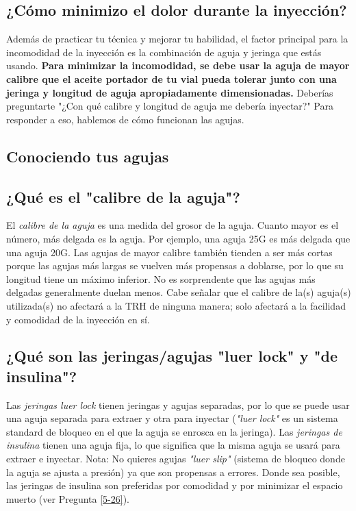 \documentclass{article}
\begin{document}
\subsection{¿Cómo minimizo el dolor durante la inyección?}

Además de practicar tu técnica y mejorar tu habilidad, el factor principal para la incomodidad de la inyección es la combinación de aguja y jeringa que estás usando. \textbf{Para minimizar la incomodidad, se debe usar la aguja de mayor calibre que el aceite portador de tu vial pueda tolerar junto con una jeringa y longitud de aguja apropiadamente dimensionadas.} Deberías preguntarte "¿Con qué calibre y longitud de aguja me debería inyectar?" Para responder a eso, hablemos de cómo funcionan las agujas.

\subsection*{Conociendo tus agujas}

\subsection{¿Qué es el "calibre de la aguja"?}

El \textit{calibre de la aguja} es una medida del grosor de la aguja. Cuanto mayor es el número, más delgada es la aguja. Por ejemplo, una aguja 25G es más delgada que una aguja 20G. Las agujas de mayor calibre también tienden a ser más cortas porque las agujas más largas se vuelven más propensas a doblarse, por lo que su longitud tiene un máximo inferior. No es sorprendente que las agujas más delgadas generalmente duelan menos. Cabe señalar que el calibre de la(s) aguja(s) utilizada(s) no afectará a la TRH de ninguna manera; solo afectará a la facilidad y comodidad de la inyección en sí.

\subsection{¿Qué son las jeringas/agujas "luer lock" y "de insulina"?}\label{5-13}

Las \textit{jeringas luer lock} tienen jeringas y agujas separadas, por lo que se puede usar una aguja separada para extraer y otra para inyectar (\textit{"luer lock"} es un sistema standard de bloqueo en el que la aguja se enrosca en la jeringa). Las \textit{jeringas de insulina} tienen una aguja fija, lo que significa que la misma aguja se usará para extraer e inyectar. Nota: No quieres agujas \textit{"luer slip"} (sistema de bloqueo donde la aguja se ajusta a presión) ya que son propensas a errores. Donde sea posible, las jeringas de insulina son preferidas por comodidad y por minimizar el espacio muerto (ver Pregunta \ref{5-26}).
\end{document}
